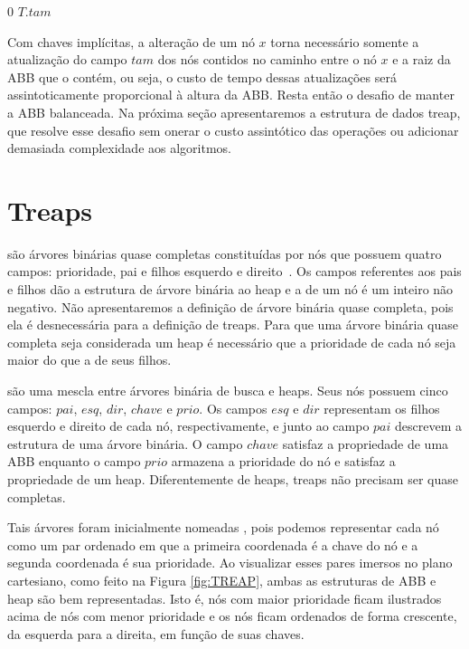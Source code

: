 \begin{algorithm}[!htb]
\caption{\treapGetSize($T$)}
\label{Algo:treapGetSize}
\begin{algorithmic}[1]
\State \Return $0$
\EndIf
\State \Return $T$.$tam$
\end{algorithmic}
\end{algorithm}

Com chaves implícitas, a alteração de um nó $x$ torna necessário somente a atualização do campo $tam$ dos nós contidos no caminho entre o nó $x$ e a raiz da ABB que o contém, ou seja, o custo de tempo dessas atualizações será assintoticamente proporcional à altura da ABB. Resta então o desafio de manter a ABB balanceada. Na próxima seção apresentaremos a estrutura de dados treap, que resolve esse desafio sem onerar o custo assintótico das operações ou adicionar demasiada complexidade aos algoritmos.

\section{Treaps}

 são árvores binárias quase completas constituídas por nós que possuem quatro campos: prioridade, pai e filhos esquerdo e direito~\cite{CLRS}. Os campos referentes aos pais e filhos dão a estrutura de árvore binária ao heap e a  de um nó é um inteiro não negativo. Não apresentaremos a definição de árvore binária quase completa, pois ela é desnecessária para a definição de treaps. Para que uma árvore binária quase completa seja considerada um heap é necessário que a prioridade de cada nó seja maior do que a de seus filhos.

 são uma mescla entre árvores binária de busca e heaps. Seus nós possuem cinco campos: $pai$, $esq$, $dir$, $chave$ e $prio$. Os campos $esq$ e $dir$ representam os filhos esquerdo e direito de cada nó, respectivamente, e junto ao campo $pai$ descrevem a estrutura de uma árvore binária. O campo $chave$ satisfaz a propriedade de uma ABB enquanto o campo $prio$ armazena a prioridade do nó e satisfaz a propriedade de um heap. Diferentemente de heaps, treaps não precisam ser quase completas.


Tais árvores foram inicialmente nomeadas  \cite{Vuillemin1980AUL}, pois podemos representar cada nó como um par ordenado em que a primeira coordenada é a chave do nó e a segunda coordenada é sua prioridade. Ao visualizar esses pares imersos no plano cartesiano, como feito na Figura \ref{fig:TREAP}, ambas as estruturas de ABB e heap são bem representadas. Isto é, nós com maior prioridade ficam ilustrados acima de nós com menor prioridade e os nós ficam ordenados de forma crescente, da esquerda para a direita, em função de suas chaves.

